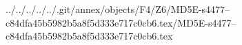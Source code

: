 ../../../../../.git/annex/objects/F4/Z6/MD5E-s4477--c84dfa45b5982b5a8f5d333e717c0cb6.tex/MD5E-s4477--c84dfa45b5982b5a8f5d333e717c0cb6.tex